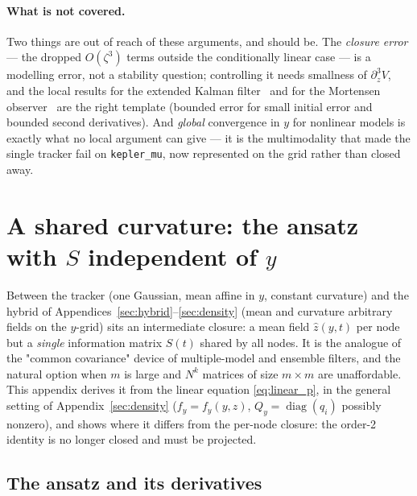 \documentclass[11pt,a4paper]{article}
\newcommand{\zh}{\hat{z}}
\theoremstyle{plain}
\theoremstyle{definition}
\theoremstyle{remark}
\begin{document}
\paragraph{What is not covered.}
Two things are out of reach of these arguments, and should be. The \emph{closure error} --- the dropped $O(\zeta^3)$ terms outside the conditionally linear case --- is a modelling error, not a stability question; controlling it needs smallness of $\partial_z^3V$, and the local results for the extended Kalman filter~\cite{Reif1999} and for the Mortensen observer~\cite{Krener2003,BreitenSchroeder2023} are the right template (bounded error for small initial error and bounded second derivatives). And \emph{global} convergence in $y$ for nonlinear models is exactly what no local argument can give --- it is the multimodality that made the single tracker fail on \texttt{kepler\_mu}, now represented on the grid rather than closed away.

\section{A shared curvature: the ansatz with $S$ independent of $y$}
\label{sec:sharedS}

Between the tracker (one Gaussian, mean affine in $y$, constant curvature) and the hybrid of Appendices~\ref{sec:hybrid}--\ref{sec:density} (mean and curvature arbitrary fields on the $y$-grid) sits an intermediate closure: a mean field $\zh(y,t)$ per node but a \emph{single} information matrix $S(t)$ shared by all nodes. It is the analogue of the "common covariance" device of multiple-model and ensemble filters, and the natural option when $m$ is large and $N^k$ matrices of size $m\times m$ are unaffordable. This appendix derives it from the linear equation \eqref{eq:linear_p}, in the general setting of Appendix~\ref{sec:density} ($f_y=f_y(y,z)$, $Q_y=\operatorname{diag}(q_i)$ possibly nonzero), and shows where it differs from the per-node closure: the order-2 identity is no longer closed and must be projected.

\subsection{The ansatz and its derivatives}
\end{document}
